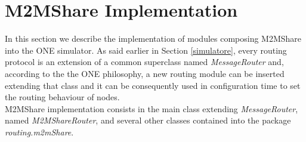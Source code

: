 \section{M2MShare Implementation}
In this section we describe the implementation of modules composing M2MShare into the ONE simulator. As said earlier in Section \ref{simulatore}, every routing protocol is an extension of a common superclass named \textit{MessageRouter} and, according to the the ONE philosophy, a new routing module can be inserted extending that class and it can be consequently used in configuration time to set the routing behaviour of nodes.
\\

M2MShare implementation consists in the main class extending \textit{MessageRouter}, named \textit{M2MShareRouter}, and several other classes contained into the package \textit{routing.m2mShare}.

